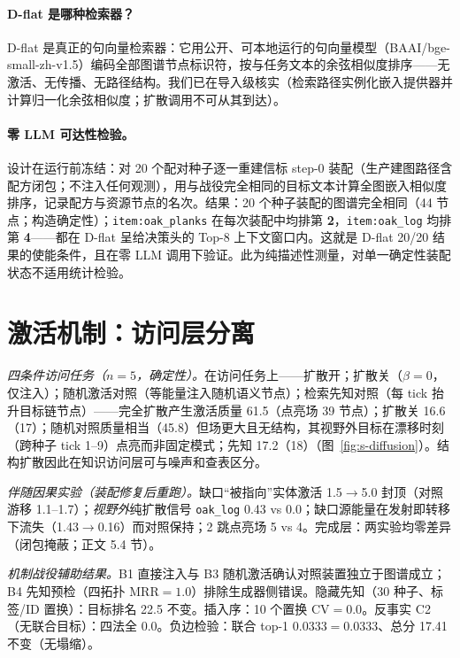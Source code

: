 \documentclass[10pt,a4paper]{ctexart}
\begin{document}
\paragraph{D-flat 是哪种检索器？}D-flat 是真正的句向量检索器：它用公开、可本地运行的句向量模型（BAAI/bge-small-zh-v1.5）编码全部图谱节点标识符，按与任务文本的余弦相似度排序——无激活、无传播、无路径结构。我们已在导入级核实（检索路径实例化嵌入提供器并计算归一化余弦相似度；扩散调用不可从其到达）。

\paragraph{零 LLM 可达性检验。}设计在运行前冻结：对 20 个配对种子逐一重建信标 step-0 装配（生产建图路径含配方闭包；不注入任何观测），用与战役完全相同的目标文本计算全图嵌入相似度排序，记录配方与资源节点的名次。结果：20 个种子装配的图谱完全相同（44 节点；构造确定性）；\texttt{item:oak\_planks} 在每次装配中均排第 \textbf{2}，\texttt{item:oak\_log} 均排第 \textbf{4}——都在 D-flat 呈给决策头的 Top-8 上下文窗口内。这就是 D-flat 20/20 结果的使能条件，且在零 LLM 调用下验证。此为纯描述性测量，对单一确定性装配状态不适用统计检验。

\section{激活机制：访问层分离}
\label{s7:activation}

\emph{四条件访问任务（$n{=}5$，确定性）。}在访问任务上——扩散开；扩散关（$\beta{=}0$，仅注入）；随机激活对照（等能量注入随机语义节点）；检索先知对照（每 tick 抬升目标链节点）——完全扩散产生激活质量 61.5（点亮场 39 节点）；扩散关 16.6（17）；随机对照质量相当（45.8）但场更大且无结构，其视野外目标在漂移时刻（跨种子 tick 1--9）点亮而非固定模式；先知 17.2（18）（图~\ref{fig:s-diffusion}）。结构扩散因此在知识访问层可与噪声和查表区分。

\emph{伴随因果实验（装配修复后重跑）。}缺口“被指向”实体激活 1.5$\rightarrow$5.0 封顶（对照游移 1.1--1.7）；\emph{视野外}纯扩散信号 \texttt{oak\_log} 0.43 vs 0.0；缺口源能量在发射即转移下流失（1.43$\rightarrow$0.16）而对照保持；2 跳点亮场 5 vs 4。完成层：两实验均零差异（闭包掩蔽；正文 5.4 节）。

\emph{机制战役辅助结果。}B1 直接注入与 B3 随机激活确认对照装置独立于图谱成立；B4 先知预检（四拓扑 MRR$=1.0$）排除生成器侧错误。隐藏先知（30 种子、标签/ID 置换）：目标排名 22.5 不变。插入序：10 个置换 CV$=0.0$。反事实 C2（无联合目标）：四法全 0.0。负边检验：联合 top-1 0.0333$=$0.0333、总分 17.41 不变（无塌缩）。
\end{document}
